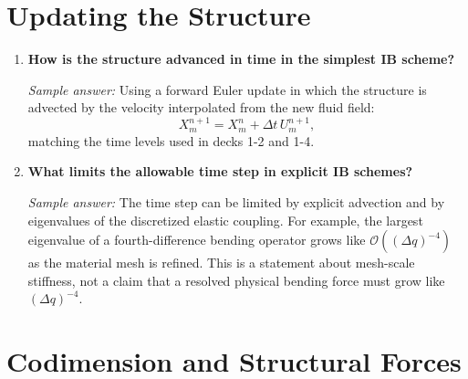 \documentclass[11pt]{article}
\begin{document}
\section*{Updating the Structure}

\begin{enumerate}[label=\arabic*., resume]

\item \textbf{How is the structure advanced in time in the simplest IB scheme?}

\textit{Sample answer:}  
Using a forward Euler update in which the structure is advected by the velocity
interpolated from the new fluid field:
\[
X^{n+1}_m = X^n_m + \Delta t \, U^{n+1}_m ,
\]
matching the time levels used in decks 1-2 and 1-4.

\item \textbf{What limits the allowable time step in explicit IB schemes?}

\textit{Sample answer:}  
The time step can be limited by explicit advection and by eigenvalues of the discretized elastic coupling. For example, the largest eigenvalue of a fourth-difference bending operator grows like $\mathcal O((\Delta q)^{-4})$ as the material mesh is refined. This is a statement about mesh-scale stiffness, not a claim that a resolved physical bending force must grow like $(\Delta q)^{-4}$.

\end{enumerate}

\section*{Codimension and Structural Forces}
\end{document}
